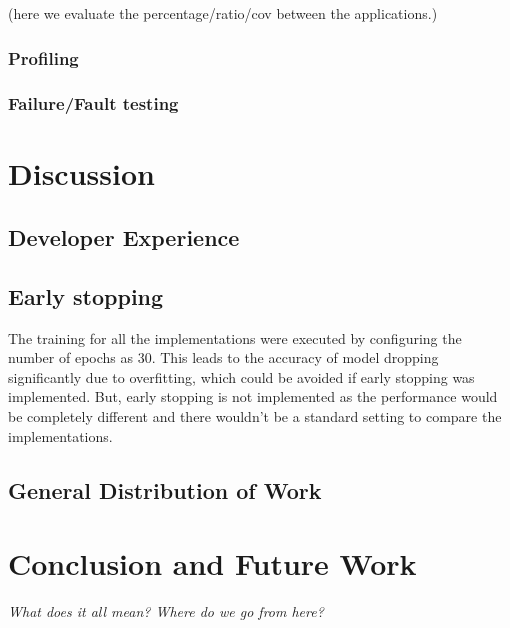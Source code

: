 (here we evaluate the percentage/ratio/cov between the applications.)

\subsection{Profiling}

\subsection{Failure/Fault testing}

\chapter{Discussion}


\section{Developer Experience}

\section{Early stopping}
The training for all the implementations were executed by configuring the number of epochs as 30. This leads to the accuracy of model dropping significantly due to overfitting, which could be avoided if early stopping was implemented.
But, early stopping is not implemented as the performance would be completely different and there wouldn't be a standard setting to compare the implementations.

\section{General Distribution of Work}

\chapter{Conclusion and Future Work}
\textit{What does it all mean? Where do we go from here?}
